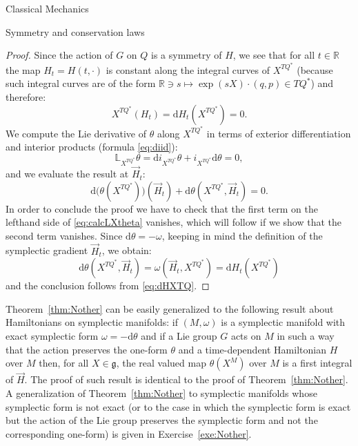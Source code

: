 \documentclass[oneside,a4paper,11pt]{amsbook}
\newcommand{\R}{\mathds R}
\newcommand{\dd}{\mathrm d}
\theoremstyle{remark}\newtheorem{exercise}{Exercise}[chapter]
\theoremstyle{plain}\newtheorem{teo}{Theorem}[section]
\theoremstyle{plain}\newtheorem{lem}[teo]{Lemma}
\theoremstyle{plain}\newtheorem{prop}[teo]{Proposition}
\theoremstyle{plain}\newtheorem{cor}[teo]{Corollary}
\theoremstyle{definition}\newtheorem{defin}[teo]{Definition}
\theoremstyle{remark}\newtheorem{rem}[teo]{Remark}
\theoremstyle{definition}\newtheorem{notation}[teo]{Notation}
\theoremstyle{definition}\newtheorem{convention}[teo]{Convention}
\theoremstyle{definition}\newtheorem{example}[teo]{Example}
\numberwithin{section}{chapter}
\numberwithin{equation}{section}
\begin{document}
\begin{chapter}{Classical Mechanics}
\begin{section}{Symmetry and conservation laws}
\begin{proof}
Since the action of $G$ on $Q$ is a symmetry of $H$, we see that for all $t\in\R$ the map $H_t=H(t,\cdot)$ is constant along
the integral curves of $X^{TQ^*}$ (because such integral curves are of the form $\R\ni s\mapsto\exp(sX)\cdot(q,p)\in TQ^*$) and therefore:
\begin{equation}\label{eq:dHXTQ}
X^{TQ^*}(H_t)=\dd H_t(X^{TQ^*})=0.
\end{equation}
We compute the Lie derivative of $\theta$ along $X^{TQ^*}$ in terms of exterior differentiation and interior products (formula \eqref{eq:diid}):
\[\mathbb L_{X^{TQ^*}}\theta=\dd i_{X^{TQ^*}}\theta+i_{X^{TQ^*}}\dd\theta=0,\]
and we evaluate the result at $\vec H_t$:
\begin{equation}\label{eq:calcLXtheta}
\dd\big(\theta(X^{TQ^*})\big)(\vec H_t)+\dd\theta(X^{TQ^*},\vec H_t)=0.
\end{equation}
In order to conclude the proof we have to check that the first term on the lefthand side of \eqref{eq:calcLXtheta} vanishes, which will follow
if we show that the second term vanishes. Since
$\dd\theta=-\omega$, keeping in mind the definition of the symplectic gradient $\vec H_t$, we obtain:
\[\dd\theta(X^{TQ^*},\vec H_t)=\omega(\vec H_t,X^{TQ^*})=\dd H_t(X^{TQ^*})\]
and the conclusion follows from \eqref{eq:dHXTQ}.
\end{proof}
Theorem~\ref{thm:Nother} can be easily generalized to the following result about Hamiltonians on symplectic manifolds: if $(M,\omega)$
is a symplectic manifold with exact symplectic form $\omega=-\dd\theta$ and if a Lie group $G$ acts on $M$ in such a way that the action preserves
the one-form $\theta$ and a time-dependent Hamiltonian $H$ over $M$ then, for all $X\in\mathfrak g$, the real valued map $\theta(X^{\!M})$ over $M$
is a first integral of $\vec H$. The proof of such result is identical to the proof of Theorem~\ref{thm:Nother}.
A generalization of Theorem~\ref{thm:Nother} to symplectic manifolds whose symplectic form is not exact (or to the case in which the symplectic form is
exact but the action of the Lie group preserves the symplectic form and not the corresponding one-form) is given in Exercise~\ref{exe:Nother}.

\medskip


\end{section}
\end{chapter}
\end{document}
